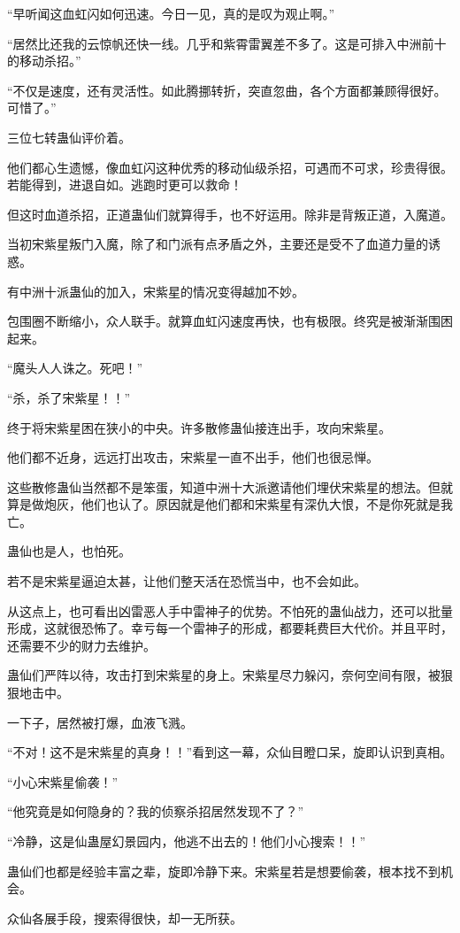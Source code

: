 \begin{this_body}
“早听闻这血虹闪如何迅速。今日一见，真的是叹为观止啊。”

“居然比还我的云惊帆还快一线。几乎和紫霄雷翼差不多了。这是可排入中洲前十的移动杀招。”

“不仅是速度，还有灵活性。如此腾挪转折，突直忽曲，各个方面都兼顾得很好。可惜了。”

三位七转蛊仙评价着。

他们都心生遗憾，像血虹闪这种优秀的移动仙级杀招，可遇而不可求，珍贵得很。若能得到，进退自如。逃跑时更可以救命！

但这时血道杀招，正道蛊仙们就算得手，也不好运用。除非是背叛正道，入魔道。

当初宋紫星叛门入魔，除了和门派有点矛盾之外，主要还是受不了血道力量的诱惑。

有中洲十派蛊仙的加入，宋紫星的情况变得越加不妙。

包围圈不断缩小，众人联手。就算血虹闪速度再快，也有极限。终究是被渐渐围困起来。

“魔头人人诛之。死吧！”

“杀，杀了宋紫星！！”

终于将宋紫星困在狭小的中央。许多散修蛊仙接连出手，攻向宋紫星。

他们都不近身，远远打出攻击，宋紫星一直不出手，他们也很忌惮。

这些散修蛊仙当然都不是笨蛋，知道中洲十大派邀请他们埋伏宋紫星的想法。但就算是做炮灰，他们也认了。原因就是他们都和宋紫星有深仇大恨，不是你死就是我亡。

蛊仙也是人，也怕死。

若不是宋紫星逼迫太甚，让他们整天活在恐慌当中，也不会如此。

从这点上，也可看出凶雷恶人手中雷神子的优势。不怕死的蛊仙战力，还可以批量形成，这就很恐怖了。幸亏每一个雷神子的形成，都要耗费巨大代价。并且平时，还需要不少的财力去维护。

蛊仙们严阵以待，攻击打到宋紫星的身上。宋紫星尽力躲闪，奈何空间有限，被狠狠地击中。

一下子，居然被打爆，血液飞溅。

“不对！这不是宋紫星的真身！！”看到这一幕，众仙目瞪口呆，旋即认识到真相。

“小心宋紫星偷袭！”

“他究竟是如何隐身的？我的侦察杀招居然发现不了？”

“冷静，这是仙蛊屋幻景园内，他逃不出去的！他们小心搜索！！”

蛊仙们也都是经验丰富之辈，旋即冷静下来。宋紫星若是想要偷袭，根本找不到机会。

众仙各展手段，搜索得很快，却一无所获。


\end{this_body}
